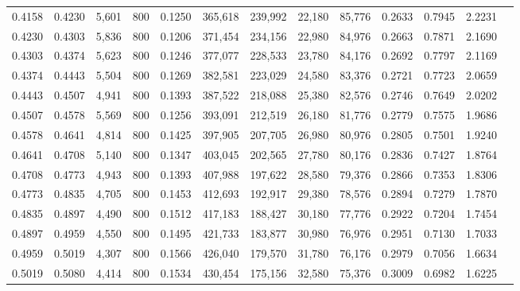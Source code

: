 \begin{tabular}{rrrrrrrrrrrrr}
0.4158 & 0.4230 &  5,601 &   800 &                                     0.1250 & 365,618 & 239,992 &  22,180 &  85,776 & 0.2633 & 0.7945 & 2.2231 \\
0.4230 & 0.4303 &  5,836 &   800 &                                     0.1206 & 371,454 & 234,156 &  22,980 &  84,976 & 0.2663 & 0.7871 & 2.1690 \\
0.4303 & 0.4374 &  5,623 &   800 &                                     0.1246 & 377,077 & 228,533 &  23,780 &  84,176 & 0.2692 & 0.7797 & 2.1169 \\
0.4374 & 0.4443 &  5,504 &   800 &                                     0.1269 & 382,581 & 223,029 &  24,580 &  83,376 & 0.2721 & 0.7723 & 2.0659 \\
0.4443 & 0.4507 &  4,941 &   800 &                                     0.1393 & 387,522 & 218,088 &  25,380 &  82,576 & 0.2746 & 0.7649 & 2.0202 \\
0.4507 & 0.4578 &  5,569 &   800 &                                     0.1256 & 393,091 & 212,519 &  26,180 &  81,776 & 0.2779 & 0.7575 & 1.9686 \\
0.4578 & 0.4641 &  4,814 &   800 &                                     0.1425 & 397,905 & 207,705 &  26,980 &  80,976 & 0.2805 & 0.7501 & 1.9240 \\
0.4641 & 0.4708 &  5,140 &   800 &                                     0.1347 & 403,045 & 202,565 &  27,780 &  80,176 & 0.2836 & 0.7427 & 1.8764 \\
0.4708 & 0.4773 &  4,943 &   800 &                                     0.1393 & 407,988 & 197,622 &  28,580 &  79,376 & 0.2866 & 0.7353 & 1.8306 \\
0.4773 & 0.4835 &  4,705 &   800 &                                     0.1453 & 412,693 & 192,917 &  29,380 &  78,576 & 0.2894 & 0.7279 & 1.7870 \\
0.4835 & 0.4897 &  4,490 &   800 &                                     0.1512 & 417,183 & 188,427 &  30,180 &  77,776 & 0.2922 & 0.7204 & 1.7454 \\
0.4897 & 0.4959 &  4,550 &   800 &                                     0.1495 & 421,733 & 183,877 &  30,980 &  76,976 & 0.2951 & 0.7130 & 1.7033 \\
0.4959 & 0.5019 &  4,307 &   800 &                                     0.1566 & 426,040 & 179,570 &  31,780 &  76,176 & 0.2979 & 0.7056 & 1.6634 \\
0.5019 & 0.5080 &  4,414 &   800 &                                     0.1534 & 430,454 & 175,156 &  32,580 &  75,376 & 0.3009 & 0.6982 & 1.6225 \\

\end{tabular}
